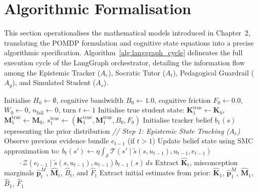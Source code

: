 \documentclass[11pt,a4paper]{report}
\begin{document}
\section{Algorithmic Formalisation}
This section operationalises the mathematical models introduced in Chapter~2, translating the POMDP formulation and cognitive state equations into a precise algorithmic specification. Algorithm~\ref{alg:langgraph_cycle} delineates the full execution cycle of the LangGraph orchestrator, detailing the information flow among the Epistemic Tracker ($A_e$), Socratic Tutor ($A_t$), Pedagogical Guardrail ($A_g$), and Simulated Student ($A_s$).

\begin{algorithm}[p]
\caption{LangGraph Multi-Agent Educational Simulation Cycle}
\label{alg:langgraph_cycle}
\footnotesize
\begin{algorithmic}[1]
\State Initialise $H_0 \gets \emptyset$, cognitive bandwidth $B_0 \gets 1.0$, cognitive friction $F_0 \gets 0.0$, $W_0\gets0$, $n_{\text{fail}}\gets0$, turn $t \gets 1$
\State Initialise true student state: $\mathbf{K}_1^{\text{true}} \gets \mathbf{K}_0$, $\mathbf{M}_1^{\text{true}} \gets \mathbf{M}_0$, $s^{\text{true}}_1 \gets (\mathbf{K}_1^{\text{true}}, \mathbf{M}_1^{\text{true}}, B_0, F_0)$
\State Initialise tracker belief $b_1(s)$ representing the prior distribution
    \State \textit{// Step 1: Epistemic State Tracking ($A_e$)}
    \State Observe previous evidence bundle $e_{t-1}$ (if $t > 1$)
        \State Update belief state using SMC approximation to:
        \State $b_t(s') \gets \eta\int_{\mathcal{S}}\mathcal{T}(s'\mid\tilde{s}(s,u_{t-1}),u_{t-1},e_{t-1})$
        \Statex \hspace{\algorithmicindent}$\qquad\cdot\mathcal{Z}(e_{t-1}\mid\tilde{s}(s,u_{t-1}),u_{t-1})b_{t-1}(s)\,ds$
        \State Extract $\hat{\mathbf{K}}_t$, misconception marginals $\hat{\mathbf{p}}^M_t$, $\hat{\mathbf{M}}_t$, $\hat{B}_t$, and $\hat{F}_t$
    \Else
        \State Extract initial estimates from prior: $\hat{\mathbf{K}}_1$, $\hat{\mathbf{p}}^M_1$, $\hat{\mathbf{M}}_1$, $\hat{B}_1$, $\hat{F}_1$
    \EndIf
    

\end{algorithmic}
\end{algorithm}
\end{document}
